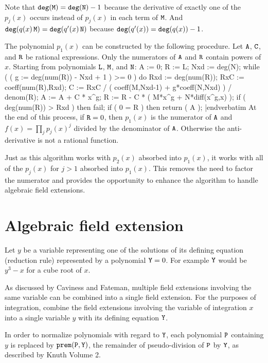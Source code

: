 Note that ${\tt{deg}}({\tt{M}})={\tt{deg}}({\tt{N}})-1$ because the
derivative of exactly one of the $p_j(x)$ occurs instead of $p_j(x)$
in each term of ${\tt{M}}$.  And
${\tt{deg}}(q(x)\,{\tt{M}})={\tt{deg}}(q'(x)\,{\tt{N}})$ because
${\tt{deg}}(q'(x))={\tt{deg}}(q(x))-1$.

The polynomial $p_1(x)$ can be constructed by the following procedure.
Let ${\tt{A}}$, ${\tt{C}}$, and ${\tt{R}}$ be rational expressions.
Only the numerators of ${\tt{A}}$ and ${\tt{R}}$ contain powers of
$x$.  Starting from polynomials ${\tt{L}}$, ${\tt{M}}$, and
${\tt{N}}$:
\medskip
\verbatim
  A := 0;
  R := L;
  Nxd := deg(N);
  while ( ( g := deg(num(R)) - Nxd + 1 ) >= 0 ) do
    Rxd := deg(num(R));
    RxC := coeff(num(R),Rxd);
    C := RxC / ( coeff(M,Nxd-1) + g*coeff(N,Nxd) ) / denom(R);
    A := A + C * x^g;
    R := R - C * ( M*x^g + N*diff(x^g,x) );
    if ( deg(num(R)) > Rxd ) then fail;
    if ( 0 = R ) then return ( A );
|endverbatim
\medskip
At the end of this process, if ${\tt{R}}=0$, then $p_1(x)$ is the
numerator of ${\tt{A}}$ and $f(x)=\prod_jp_j(x)^j$ divided by the
denominator of ${\tt{A}}$.  Otherwise the anti-derivative is not a
rational function.

\medskip
Just as this algorithm works with $p_2(x)$ absorbed into $p_1(x)$, it
works with all of the $p_j(x)$ for $j>1$ absorbed into $p_1(x)$.  This
removes the need to factor the numerator and provides the opportunity
to enhance the algorithm to handle algebraic field extensions.

\section{Algebraic field extension}

Let $y$ be a variable representing one of the solutions of its
defining equation (reduction rule) represented by a polynomial
${\tt{Y}}=0$.  For example ${\tt{Y}}$ would be $y^3-x$ for a cube root
of $x$.

As discussed by Caviness and
Fateman\cite{Caviness:1976:SRE:800205.806352}, multiple field
extensions involving the same variable can be combined into a single
field extension.  For the purposes of integration, combine the field
extensions involving the variable of integration $x$ into a single
variable $y$ with its defining equation ${\tt{Y}}$.

In order to normalize polynomials with regard to ${\tt{Y}}$, each
polynomial ${\tt{P}}$ containing $y$ is replaced by
${\tt{prem(P,Y)}}$, the remainder of pseudo-division of ${\tt{P}}$ by
${\tt{Y}}$, as described by Knuth Volume 2\cite{KnuthVol2}.

